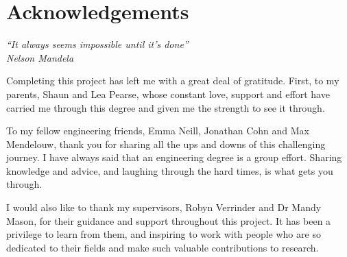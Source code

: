 \chapter{Acknowledgements}
\label{ch:ack}

\begin{flushright}
\itshape ``It always seems impossible until it's done''\\[2pt]
\upshape Nelson Mandela
\end{flushright}
\vspace{0.5cm}

Completing this project has left me with a great deal of gratitude. First, to my parents, Shaun and Lea Pearse, whose constant love, support and effort have carried me through this degree and given me the strength to see it through.

To my fellow engineering friends, Emma Neill, Jonathan Cohn and Max Mendelouw, thank you for sharing all the ups and downs of this challenging journey. I have always said that an engineering degree is a group effort. Sharing knowledge and advice, and laughing through the hard times, is what gets you through.

I would also like to thank my supervisors, Robyn Verrinder and Dr Mandy Mason, for their guidance and support throughout this project. It has been a privilege to learn from them, and inspiring to work with people who are so dedicated to their fields and make such valuable contributions to research.

